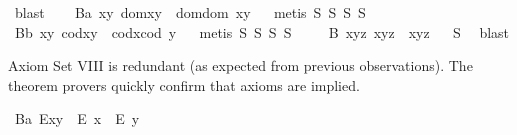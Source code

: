 \begin{isabellebody}
\ blast%
\endisatagproof
{\isafoldproof}%
%
\isadelimproof
%
\endisadelimproof
\isanewline
\ \ \isamarkupfalse%
\ B{}a{\isacharcolon}\ {\isachardoublequoteopen}\isactrlbold {\isasymforall}x{\isachardot}\isactrlbold {\isasymforall}y{\isachardot}\ dom{\isacharparenleft}x{\isasymcdot}y{\isacharparenright}\ {\isasymcong}\ dom{\isacharparenleft}{\isacharparenleft}dom\ x{\isacharparenright}{\isasymcdot}y{\isacharparenright}{\isachardoublequoteclose}%
\isadelimproof
\ %
\endisadelimproof
%
\isatagproof
{}\isamarkupfalse%
\ {\isacharparenleft}metis\ S{}\ S{}\ S{}\ S{}{\isacharparenright}%
\endisatagproof
{\isafoldproof}%
%
\isadelimproof
%
\endisadelimproof
\isanewline
\ \ \isamarkupfalse%
\ B{}b{\isacharcolon}\ {\isachardoublequoteopen}\isactrlbold {\isasymforall}x{\isachardot}\isactrlbold {\isasymforall}y{\isachardot}\ cod{\isacharparenleft}x{\isasymcdot}y{\isacharparenright}\ {\isasymcong}\ cod{\isacharparenleft}x{\isasymcdot}{\isacharparenleft}cod\ y{\isacharparenright}{\isacharparenright}{\isachardoublequoteclose}%
\isadelimproof
\ %
\endisadelimproof
%
\isatagproof
{}\isamarkupfalse%
\ {\isacharparenleft}metis\ S{}\ S{}\ S{}\ S{}{\isacharparenright}%
\endisatagproof
{\isafoldproof}%
%
\isadelimproof
%
\endisadelimproof
\isanewline
\ \ \isamarkupfalse%
\ \ B{}{\isacharcolon}\ {\isachardoublequoteopen}\isactrlbold {\isasymforall}x{\isachardot}\isactrlbold {\isasymforall}y{\isachardot}\isactrlbold {\isasymforall}z{\isachardot}\ x{\isasymcdot}{\isacharparenleft}y{\isasymcdot}z{\isacharparenright}\ {\isasymcong}\ {\isacharparenleft}x{\isasymcdot}y{\isacharparenright}{\isasymcdot}z{\isachardoublequoteclose}%
\isadelimproof
\ %
\endisadelimproof
%
\isatagproof
{}\isamarkupfalse%
\ S{}\ \isamarkupfalse%
\ blast%
\endisatagproof
{\isafoldproof}%
%
\isadelimproof
%
\endisadelimproof
%
\begin{isamarkuptext}%
Axiom Set VIII is redundant (as expected from previous observations).
The theorem provers quickly confirm that axioms  are implied.%
\end{isamarkuptext}\isamarkuptrue%
\ B{}a{\isacharcolon}\ {\isachardoublequoteopen}E{\isacharparenleft}x{\isasymcdot}y{\isacharparenright}\ \isactrlbold {\isasymrightarrow}\ {\isacharparenleft}E\ x\ \isactrlbold {\isasymand}\ E\ y{\isacharparenright}{\isachardoublequoteclose}\ \isanewline

\end{isabellebody}
